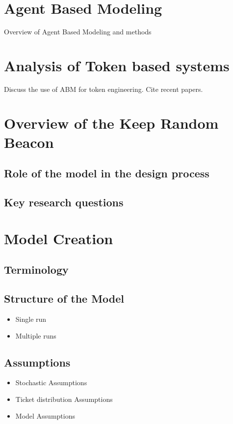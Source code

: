 \documentclass[conference]{IEEEtran}
\begin{document}
\section{Agent Based Modeling}

Overview of Agent Based Modeling and methods

\section{Analysis of Token based systems}

Discuss the use of ABM for token engineering. Cite recent papers.

\section{Overview of the Keep Random Beacon}

\subsection{Role of the model in the design process}

\subsection{Key research questions}

\section{Model Creation}

\subsection{Terminology}

\subsection{Structure of the Model}
\begin{itemize}

\item Single run
\item Multiple runs
    
\end{itemize}

\subsection{Assumptions}
\begin{itemize}
\item Stochastic Assumptions
\item Ticket distribution Assumptions
\item Model Assumptions
\end{itemize}
    
\end{document}
